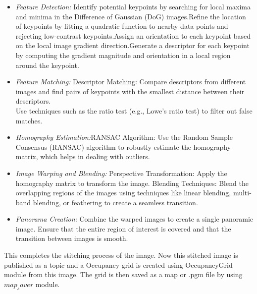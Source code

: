 \documentclass{josis}
\begin{document}
\begin{itemize}
    \item {\em Feature Detection:} Identify potential keypoints by searching for local maxima and minima in the Difference of Gaussian (DoG) images.Refine the location of keypoints by fitting a quadratic function to nearby data points and rejecting low-contrast keypoints.Assign an orientation to each keypoint based on the local image gradient direction.Generate a descriptor for each keypoint by computing the gradient magnitude and orientation in a local region around the keypoint.
    \item {\em Feature Matching:} Descriptor Matching: Compare descriptors from different images and find pairs of keypoints with the smallest distance between their descriptors.\\
    Use techniques such as the ratio test (e.g., Lowe's ratio test) to filter out false matches.
    \item {\em Homography Estimation:}RANSAC Algorithm: Use the Random Sample Consensus (RANSAC) algorithm to robustly estimate the homography matrix, which helps in dealing with outliers.
    \item {\em Image Warping and Blending: } Perspective Transformation: Apply the homography matrix to transform the image. Blending Techniques: Blend the overlapping regions of the images using techniques like linear blending, multi-band blending, or feathering to create a seamless transition.
    \item {\em Panorama Creation: }Combine the warped images to create a single panoramic image. Ensure that the entire region of interest is covered and that the transition between images is smooth.
\end{itemize}
This completes the stitching process of the image. Now this stitched image is published as a topic and a Occupancy grid is created using OccupancyGrid module from this image. The grid is then saved as a map or .pgm file by using $map_saver$ module.
\end{document}
